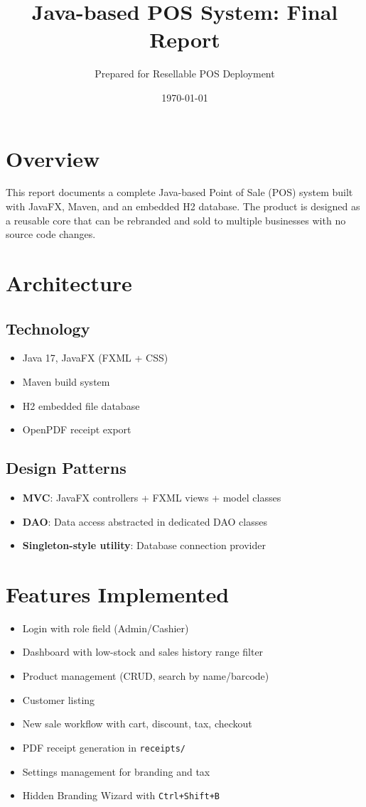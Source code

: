 \documentclass[12pt]{article}
\title{Java-based POS System: Final Report}
\author{Prepared for Resellable POS Deployment}
\date{\today}
\begin{document}
\maketitle

\section{Overview}
This report documents a complete Java-based Point of Sale (POS) system built with JavaFX, Maven, and an embedded H2 database. The product is designed as a reusable core that can be rebranded and sold to multiple businesses with no source code changes.

\section{Architecture}
\subsection{Technology}
\begin{itemize}[leftmargin=*]
    \item Java 17, JavaFX (FXML + CSS)
    \item Maven build system
    \item H2 embedded file database
    \item OpenPDF receipt export
\end{itemize}

\subsection{Design Patterns}
\begin{itemize}[leftmargin=*]
    \item \textbf{MVC}: JavaFX controllers + FXML views + model classes
    \item \textbf{DAO}: Data access abstracted in dedicated DAO classes
    \item \textbf{Singleton-style utility}: Database connection provider
\end{itemize}

\section{Features Implemented}
\begin{itemize}[leftmargin=*]
    \item Login with role field (Admin/Cashier)
    \item Dashboard with low-stock and sales history range filter
    \item Product management (CRUD, search by name/barcode)
    \item Customer listing
    \item New sale workflow with cart, discount, tax, checkout
    \item PDF receipt generation in \texttt{receipts/}
    \item Settings management for branding and tax
    \item Hidden Branding Wizard with \texttt{Ctrl+Shift+B}
\end{itemize}
\end{document}
